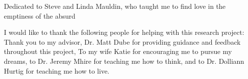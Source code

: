 \begin{dedication}
Dedicated to Steve and Linda Mauldin, who taught me to find love in the emptiness of the absurd 
\end{dedication}

\begin{acknowledgements}
I would like to thank the following people for helping with this research project:
Thank you to my advisor, Dr. Matt Dube for providing guidance and feedback throughout this project, To my wife Katie for encouraging me to pursue my dreams, to Dr. Jeremy Mhire for teaching me how to think, and to Dr. Dolliann Hurtig for teaching me how to live. 
\end{acknowledgements}

\pagebreak

\tableofcontents

\pagebreak

\listoftables	

\pagebreak
\listoffigures		
\pagebreak		%



\mainmatter

\endinput
